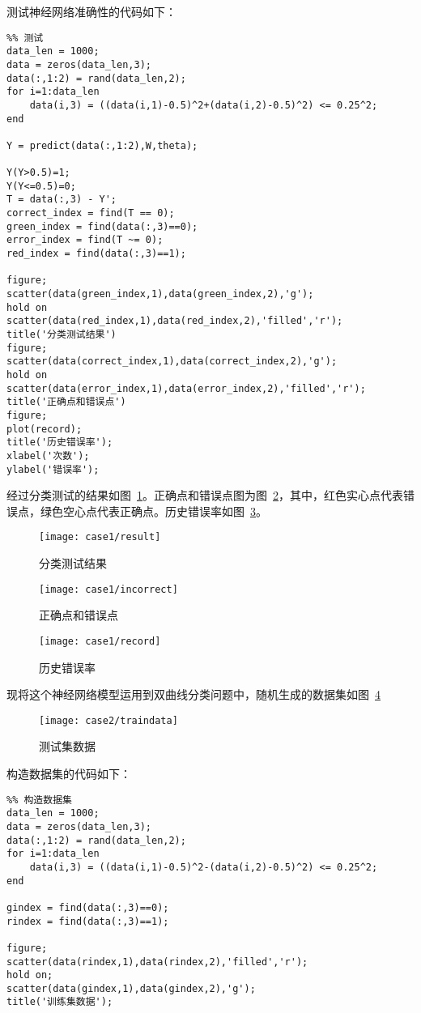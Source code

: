 测试神经网络准确性的代码如下：

\begin{lstlisting}
%% 测试
data_len = 1000;
data = zeros(data_len,3);
data(:,1:2) = rand(data_len,2);
for i=1:data_len
    data(i,3) = ((data(i,1)-0.5)^2+(data(i,2)-0.5)^2) <= 0.25^2;
end

Y = predict(data(:,1:2),W,theta);

Y(Y>0.5)=1;
Y(Y<=0.5)=0;
T = data(:,3) - Y';
correct_index = find(T == 0);
green_index = find(data(:,3)==0);
error_index = find(T ~= 0);
red_index = find(data(:,3)==1);

figure;
scatter(data(green_index,1),data(green_index,2),'g');
hold on
scatter(data(red_index,1),data(red_index,2),'filled','r');
title('分类测试结果')
figure;
scatter(data(correct_index,1),data(correct_index,2),'g');
hold on
scatter(data(error_index,1),data(error_index,2),'filled','r');
title('正确点和错误点')
figure;
plot(record);
title('历史错误率');
xlabel('次数');
ylabel('错误率');
\end{lstlisting}

经过分类测试的结果如图~\ref{fig:case1:result}。正确点和错误点图为图~\ref{fig:case1:incorrect}，其中，红色实心点代表错误点，绿色空心点代表正确点。历史错误率如图~\ref{fig:case1:record}。

\begin{figure}[h] 
 \centering
  \texttt{[image: case1/result]}
  \caption{分类测试结果}
  \label{fig:case1:result}
\end{figure}
\begin{figure}[h] 
 \centering
  \texttt{[image: case1/incorrect]}
  \caption{正确点和错误点}
  \label{fig:case1:incorrect}
\end{figure}
\begin{figure}[h] 
 \centering
  \texttt{[image: case1/record]}
  \caption{历史错误率}
  \label{fig:case1:record}
\end{figure}

现将这个神经网络模型运用到双曲线分类问题中，随机生成的数据集如图~\ref{fig:case2:traindata}

\begin{figure}[h] 
 \centering
  \texttt{[image: case2/traindata]}
  \caption{测试集数据}
  \label{fig:case2:traindata}
\end{figure}

构造数据集的代码如下：

\begin{lstlisting}
%% 构造数据集
data_len = 1000;
data = zeros(data_len,3);
data(:,1:2) = rand(data_len,2);
for i=1:data_len
    data(i,3) = ((data(i,1)-0.5)^2-(data(i,2)-0.5)^2) <= 0.25^2;
end

gindex = find(data(:,3)==0);
rindex = find(data(:,3)==1);

figure;
scatter(data(rindex,1),data(rindex,2),'filled','r');
hold on;
scatter(data(gindex,1),data(gindex,2),'g');
title('训练集数据');
\end{lstlisting}

